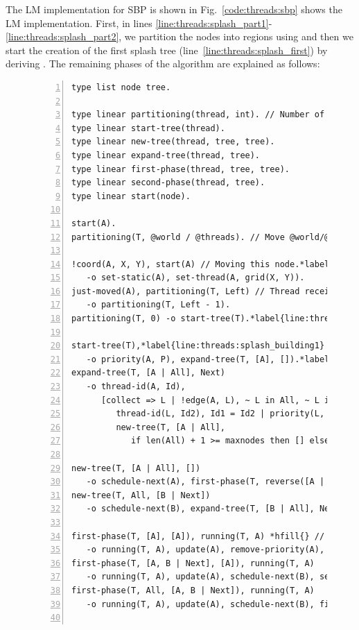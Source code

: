 The LM implementation for SBP is shown in Fig.~\ref{code:threads:sbp} shows the
LM implementation. First, in lines
\ref{line:threads:splash_part1}-\ref{line:threads:splash_part2}, we partition
the nodes into regions using  and then we start the creation of
the first splash tree (line~\ref{line:threads:splash_first}) by deriving
.  The remaining phases of the algorithm are explained as
follows:

\begin{figure}[!htb]
\begin{Verbatim}[numbers=left,commandchars=*\{\},fontsize=\codesize]
type list node tree.

type linear partitioning(thread, int). // Number of nodes to receive.
type linear start-tree(thread).
type linear new-tree(thread, tree, tree).
type linear expand-tree(thread, tree).
type linear first-phase(thread, tree, tree).
type linear second-phase(thread, tree).
type linear start(node).

start(A).
partitioning(T, @world / @threads). // Move @world/@threads nodes.

!coord(A, X, Y), start(A) // Moving this node.*label{line:threads:splash_part1}
   -o set-static(A), set-thread(A, grid(X, Y)).
just-moved(A), partitioning(T, Left) // Thread received another node.
   -o partitioning(T, Left - 1).
partitioning(T, 0) -o start-tree(T).*label{line:threads:splash_part2}*label{line:threads:splash_first}

start-tree(T),*label{line:threads:splash_building1} priority(A, P), P > 0.0 *hfill{} // Tree building
   -o priority(A, P), expand-tree(T, [A], []).*label{line:threads:splash_building2}
expand-tree(T, [A | All], Next)
   -o thread-id(A, Id),
      [collect => L | !edge(A, L), ~ L in All, ~ L in Next,*label{line:threads:splash_agg1} priority(L, P), P > 0.0,
         thread-id(L, Id2), Id1 = Id2 | priority(L, P), thread-id(L, Id2) |
         new-tree(T, [A | All],
            if len(All) + 1 >= maxnodes then [] else Next ++ L end)].*label{line:threads:splash_agg2}*label{line:threads:splash_next}

new-tree(T, [A | All], [])
   -o schedule-next(A), first-phase(T, reverse([A | All]), [A | All]).*label{line:threads:splash_first_phase}
new-tree(T, All, [B | Next])
   -o schedule-next(B), expand-tree(T, [B | All], Next).

first-phase(T, [A], [A]), running(T, A) *hfill{} // First phase
   -o running(T, A), update(A), remove-priority(A), start-tree(T).
first-phase(T, [A, B | Next], [A]), running(T, A)
   -o running(T, A), update(A), schedule-next(B), second-phase(T, [B | Next]).*label{line:threads:splash_first_update1}
first-phase(T, All, [A, B | Next]), running(T, A)
   -o running(T, A), update(A), schedule-next(B), first-phase(T, All, [B | Next]).*label{line:threads:splash_first_update2}


\end{Verbatim}
\end{figure}
